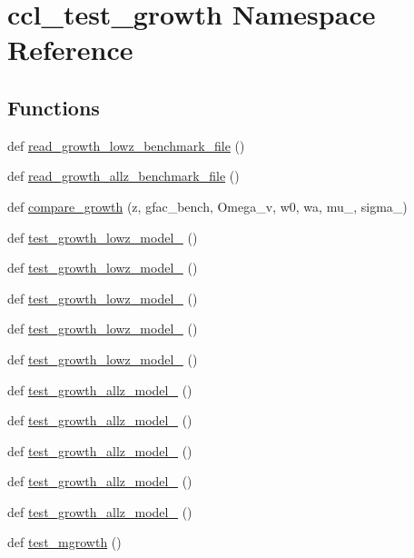 \hypertarget{namespaceccl__test__growth}{}\section{ccl\+\_\+test\+\_\+growth Namespace Reference}
\label{namespaceccl__test__growth}
\subsection*{Functions}
\begin{DoxyCompactItemize}
\item 
def \mbox{\hyperlink{namespaceccl__test__growth_ac1171a8ec4ef57387a5b8ada42d58d7a}{read\+\_\+growth\+\_\+lowz\+\_\+benchmark\+\_\+file}} ()
\item 
def \mbox{\hyperlink{namespaceccl__test__growth_a2f8c205fa1a57bf8d2b31752e4798701}{read\+\_\+growth\+\_\+allz\+\_\+benchmark\+\_\+file}} ()
\item 
def \mbox{\hyperlink{namespaceccl__test__growth_a27927b78f1df23384bee9dca46f09ad1}{compare\+\_\+growth}} (z, gfac\+\_\+bench, Omega\+\_\+v, w0, wa, mu\+\_, sigma\+\_)
\item 
def \mbox{\hyperlink{namespaceccl__test__growth_a37838dca6429b3ad372cb6f4e1607f02}{test\+\_\+growth\+\_\+lowz\+\_\+model\+\_}} ()
\item 
def \mbox{\hyperlink{namespaceccl__test__growth_a62a2adfaaf52c3522dad85aa3b077878}{test\+\_\+growth\+\_\+lowz\+\_\+model\+\_}} ()
\item 
def \mbox{\hyperlink{namespaceccl__test__growth_a59d1991b320004d1a7c84d4f6e1ecc60}{test\+\_\+growth\+\_\+lowz\+\_\+model\+\_}} ()
\item 
def \mbox{\hyperlink{namespaceccl__test__growth_abaf835d5b6bda8ea5af529151634f0d8}{test\+\_\+growth\+\_\+lowz\+\_\+model\+\_}} ()
\item 
def \mbox{\hyperlink{namespaceccl__test__growth_aace2d2e9356f024b35b6a0e6bfe16b20}{test\+\_\+growth\+\_\+lowz\+\_\+model\+\_}} ()
\item 
def \mbox{\hyperlink{namespaceccl__test__growth_abc7a6f255bc64edc4b8af6e8e98914f1}{test\+\_\+growth\+\_\+allz\+\_\+model\+\_}} ()
\item 
def \mbox{\hyperlink{namespaceccl__test__growth_a5d87ba3e86e28bed7f6916eb7ca3f54d}{test\+\_\+growth\+\_\+allz\+\_\+model\+\_}} ()
\item 
def \mbox{\hyperlink{namespaceccl__test__growth_ae53198dc05e94a55e99a5d24bf2f69b2}{test\+\_\+growth\+\_\+allz\+\_\+model\+\_}} ()
\item 
def \mbox{\hyperlink{namespaceccl__test__growth_afeb9f9f787f58ed05eec0682e11459e8}{test\+\_\+growth\+\_\+allz\+\_\+model\+\_}} ()
\item 
def \mbox{\hyperlink{namespaceccl__test__growth_ad4ab5faac417ef4cabecdb6feeed686c}{test\+\_\+growth\+\_\+allz\+\_\+model\+\_}} ()
\item 
def \mbox{\hyperlink{namespaceccl__test__growth_afedd7b6f40c09a4284691b608ca9326f}{test\+\_\+mgrowth}} ()
\end{DoxyCompactItemize}
